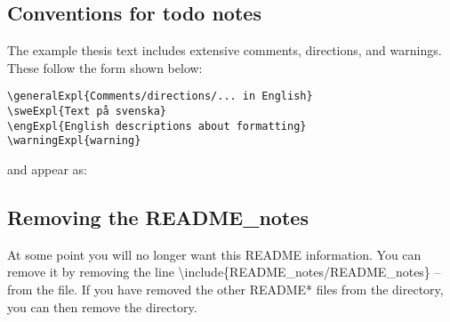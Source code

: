 \subsection{Conventions for todo notes}
\label{sec:todonotes}
The example thesis text includes extensive comments, directions, and warnings. These follow the form shown below:
\begin{lstlisting}
\generalExpl{Comments/directions/... in English}
\sweExpl{Text på svenska}
\engExpl{English descriptions about formatting}
\warningExpl{warning}  
\end{lstlisting}
and appear as:

\subsection{Removing the README\_notes}
At some point you will no longer want this README information. You can remove it by removing the line
\textbackslash include\{README\_notes/README\_notes\} -- from the  file. If you have removed the other README* files from the  directory, you can then remove the  directory.

\printglossary[type=readme,toctitle={README acronyms}]


